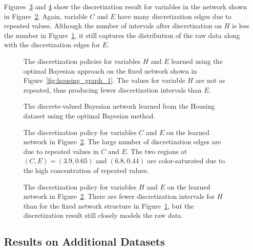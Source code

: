 \documentclass[twoside,11pt]{article}
\begin{document}
Figures~\ref{fig:housing_exp2_distr_3_5} and \ref{fig:housing_exp2_distr_8_5} show the discretization result for variables in the network shown in Figure~\ref{fig:housing_graph_2}.
Again, variable $C$ and $E$ have many discretization edges due to repeated values.
Although the number of intervals after discretization on $H$ is less the number in Figure~\ref{fig:housing_exp1_distr_8_5}, it still captures the distribution of the raw data along with the discretization edges for $E$.

\begin{figure}[H]
  \centering
  
  \caption{
    The discretization policies for variables $H$ and $E$ learned using the optimal Bayesian approach on the fixed network shown in Figure~\ref{fig:housing_graph_1}.
    The values for variable $H$ are not as repeated, thus producing fewer discretization intervals than $E$.
  }
  \label{fig:housing_exp1_distr_8_5}
\end{figure}

\begin{figure}[H]
  \centering
  \scalebox{0.8}{}
  \caption{
    The discrete-valued Bayesian network learned from the Housing dataset using the optimal Bayesian method.
  }
  \label{fig:housing_graph_2}
\end{figure}

\begin{figure}[H]
  \centering
  
  \caption{
    The discretization policy for variables $C$ and $E$ on the learned network in Figure~\ref{fig:housing_graph_2}.
    The large number of discretization edges are due to repeated values in $C$ and $E$.
    The two regions at $(C,E) = (3.9,0.65)$ and $(6.8,0.44)$ are color-saturated due to the high concentration of repeated values.
  }
  \label{fig:housing_exp2_distr_3_5}
\end{figure}

\begin{figure}[H]
  \centering
  
  \caption{
    The discretization policy for variables $H$ and $E$ on the learned network in Figure~\ref{fig:housing_graph_2}.
    There are fewer discretization intervals for $H$ than for the fixed network structure in Figure~\ref{fig:housing_exp1_distr_8_5}, but the discretization result still closely models the raw data.
  }
  \label{fig:housing_exp2_distr_8_5}
\end{figure}

\subsection{Results on Additional Datasets}
\end{document}
